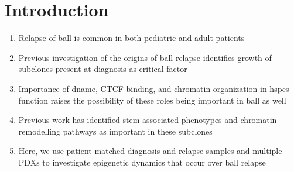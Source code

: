 \section{Introduction}

\begin{enumerate}
  \item Relapse of \gls{ball} is common in both pediatric and adult patients
  \item Previous investigation of the origins of \gls{ball} relapse identifies growth of subclones present at diagnosis as critical factor
  \item Importance of \gls{dname}, CTCF binding, and chromatin organization in \glspl{hspc} function raises the possibility of these roles being important in \gls{ball} as well
  \item Previous work has identified stem-associated phenotypes and chromatin remodelling pathways as important in these subclones
  \item Here, we use patient matched diagnosis and relapse samples and multiple PDXs to investigate epigenetic dynamics that occur over \gls{ball} relapse
\end{enumerate}
